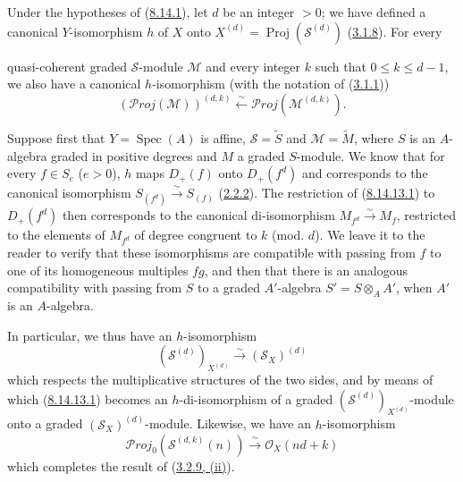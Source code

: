 \begin{remark}[8.14.13]
\label{II.8.14.13}
Under the hypotheses of (\hyperref[II.8.14.1]{8.14.1}), let $d$ be an
integer $>0$; we have defined a canonical $Y$-isomorphism $h$ of $X$ onto
$X^{(d)}=\operatorname{Proj}(\mathcal{S}^{(d)})$
(\hyperref[II.3.1.8]{3.1.8}). For every

quasi-coherent graded $\mathcal{S}$-module $\mathcal{M}$ and every integer $k$
such that $0\leqslant k\leqslant d-1$, we also have a canonical
$h$-isomorphism (with the notation of (\hyperref[II.3.1.1]{3.1.1}))
\begin{equation}
\label{II.8.14.13.1}
  (\mathcal{P}\mathit{roj}(\mathcal{M}))^{(d,k)}
  \xleftarrow{\sim}\mathcal{P}\mathit{roj}(\mathcal{M}^{(d,k)}).
\tag{8.14.13.1}
\end{equation}

Suppose first that $Y=\operatorname{Spec}(A)$ is affine,
$\mathcal{S}=\widetilde{S}$ and $\mathcal{M}=\widetilde{M}$, where $S$ is an
$A$-algebra graded in positive degrees and $M$ a graded $S$-module. We know
that for every $f\in S_e$ ($e>0$), $h$ maps $D_+(f)$ onto $D_+(f^d)$ and
corresponds to the canonical isomorphism
$S_{(f^d)}\xrightarrow{\sim}S_{(f)}$
(\hyperref[II.2.2.2]{2.2.2}). The restriction of
(\hyperref[II.8.14.13.1]{8.14.13.1}) to $D_+(f^d)$ then corresponds to the
canonical di-isomorphism $M_{f^d}\xrightarrow{\sim}M_f$, restricted to the
elements of $M_{f^d}$ of degree congruent to $k$ (mod. $d$). We leave it to
the reader to verify that these isomorphisms are compatible with passing
from $f$ to one of its homogeneous multiples $fg$, and then that there is an
analogous compatibility with passing from $S$ to a graded $A'$-algebra
$S'=S\otimes_A A'$, when $A'$ is an $A$-algebra.

In particular, we thus have an $h$-isomorphism
\begin{equation}
\label{II.8.14.13.2}
  (\mathcal{S}^{(d)})_{X^{(d)}}
  \xrightarrow{\sim}(\mathcal{S}_X)^{(d)}
\tag{8.14.13.2}
\end{equation}
which respects the multiplicative structures of the two sides, and by means
of which (\hyperref[II.8.14.13.1]{8.14.13.1}) becomes an
$h$-di-isomorphism of a graded $(\mathcal{S}^{(d)})_{X^{(d)}}$-module onto a
graded $(\mathcal{S}_X)^{(d)}$-module. Likewise, we have an $h$-isomorphism
\begin{equation}
\label{II.8.14.13.3}
  \mathcal{P}\mathit{roj}_0(\mathcal{S}^{(d,k)}(n))
  \xrightarrow{\sim}\mathcal{O}_X(nd+k)
\tag{8.14.13.3}
\end{equation}
which completes the result of (\hyperref[II.3.2.9]{3.2.9, (ii)}).


\end{remark}
